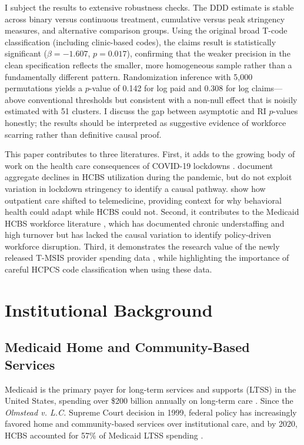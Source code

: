 \documentclass[12pt]{article}
\begin{document}
I subject the results to extensive robustness checks. The DDD estimate is stable across binary versus continuous treatment, cumulative versus peak stringency measures, and alternative comparison groups. Using the original broad T-code classification (including clinic-based codes), the claims result is statistically significant ($\beta = -1.607$, $p = 0.017$), confirming that the weaker precision in the clean specification reflects the smaller, more homogeneous sample rather than a fundamentally different pattern. Randomization inference with 5,000 permutations yields a $p$-value of 0.142 for log paid and 0.308 for log claims---above conventional thresholds but consistent with a non-null effect that is noisily estimated with 51 clusters. I discuss the gap between asymptotic and RI $p$-values honestly; the results should be interpreted as suggestive evidence of workforce scarring rather than definitive causal proof.

This paper contributes to three literatures. First, it adds to the growing body of work on the health care consequences of COVID-19 lockdowns \citep{ziedan2020effects, birkmeyer2020impact, chatterji2021covid}. \citet{werner2022hcbs} document aggregate declines in HCBS utilization during the pandemic, but do not exploit variation in lockdown stringency to identify a causal pathway. \citet{patel2021telehealth} show how outpatient care shifted to telemedicine, providing context for why behavioral health could adapt while HCBS could not. Second, it contributes to the Medicaid HCBS workforce literature \citep{scales2020, marquand2021, stone2017, gorges2020staffing}, which has documented chronic understaffing and high turnover but has lacked the causal variation to identify policy-driven workforce disruption. Third, it demonstrates the research value of the newly released T-MSIS provider spending data \citep{hhs2026tmsis}, while highlighting the importance of careful HCPCS code classification when using these data.


\section{Institutional Background}

\subsection{Medicaid Home and Community-Based Services}

Medicaid is the primary payer for long-term services and supports (LTSS) in the United States, spending over \$200 billion annually on long-term care \citep{cms2024ltss}. Since the \textit{Olmstead v. L.C.} Supreme Court decision in 1999, federal policy has increasingly favored home and community-based services over institutional care, and by 2020, HCBS accounted for 57\% of Medicaid LTSS spending \citep{eiken2018}.
\end{document}
